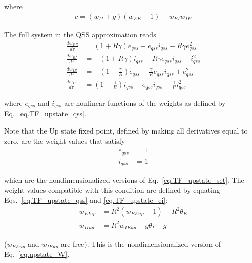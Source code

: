 \documentclass[
twocolumn,
]{article}
\newcommand{\EE}{\mathit{EE}}
\newcommand{\EI}{\mathit{EI}}
\newcommand{\IE}{\mathit{IE}}
\newcommand{\II}{\mathit{II}}
\newcommand{\up}{\mathit{up}}
\newcommand{\qss}{\mathit{qss}}
\begin{document}
\noindent where
\begin{displaymath}
\begin{aligned}
c = (w_{\II} + g)(w_{\EE} - 1) - w_{\EI} w_{\IE}
\end{aligned}
\end{displaymath}

The full system in the QSS approximation reads
\begin{equation}
\begin{aligned}
\frac{dw_{\EE}}{d\tau} & = (1+R\gamma)e_{\qss} - e_{\qss}i_{\qss} - R\gamma e_{\qss}^2 \\
\frac{dw_{\EI}}{d\tau} & = -(1+R\gamma)i_{\qss} + R\gamma e_{\qss} i_{\qss} + i_{\qss}^2 \\
\frac{dw_{\IE}}{d\tau} & = -(1-\frac{\gamma}{R})e_{\qss} -\frac{\gamma}{R} e_{\qss}i_{\qss} + e_{\qss}^2\\
\frac{dw_{\II}}{d\tau} & = (1-\frac{\gamma}{R})i_{\qss} - e_{\qss}i_{\qss} + \frac{\gamma}{R} i_{\qss}^2
\end{aligned}
\label{eq.TF_full_norm_qss}
\end{equation}

\noindent where $e_{\qss}$ and $i_{\qss}$ are nonlinear functions of the weights as defined by Eq.\ \ref{eq.TF_upstate_qss}.

Note that the Up state fixed point, defined by making all derivatives equal to zero, are the weight values that satisfy
\begin{equation}
\begin{aligned}
e_{\qss} & = 1 \\
i_{\qss} & = 1
\end{aligned}
\label{eq.TF_upstate_ei}
\end{equation}

\noindent which are the nondimensionalized versions of Eq.\ \ref{eq.TF_upstate_set}. The weight values compatible with this condition are defined by equating Eqs.\ \ref{eq.TF_upstate_qss} and \ref{eq.TF_upstate_ei}:
\begin{equation}
\begin{aligned}
w_{\EI\up} & = R^2 (w_{\EE\up} - 1) - R^2\theta_E \\
w_{\II\up} & = R^2 w_{\IE\up} - g\theta_I - g
\end{aligned}
\label{eq.TF_upstate_w}
\end{equation}

\noindent ($w_{\EE\up}$ and $w_{\IE\up}$ are free). This is the nondimensionalized version of Eq.\ \ref{eq.upstate_W}.
\end{document}
